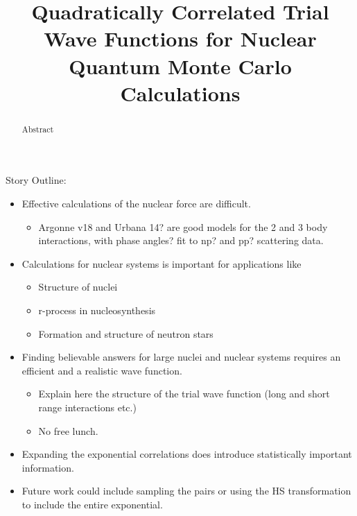\documentclass[12pt]{article}
\title{Quadratically Correlated Trial Wave Functions for Nuclear Quantum Monte Carlo Calculations}
\begin{document}
\maketitle

\begin{abstract}
Abstract
\end{abstract}

Story Outline:
\begin{itemize}
   \item Effective calculations of the nuclear force are difficult.
   \begin{itemize}
      \item Argonne v18 and Urbana 14? are good models for the 2 and 3 body interactions, with phase angles? fit to np? and pp? scattering data.
   \end{itemize}
   \item Calculations for nuclear systems is important for applications like
   \begin{itemize}
      \item Structure of nuclei
      \item r-process in nucleosynthesis
      \item Formation and structure of neutron stars
   \end{itemize}
   \item Finding believable answers for large nuclei and nuclear systems requires an efficient and a realistic wave function.
   \begin{itemize}
      \item Explain here the structure of the trial wave function (long and short range interactions etc.)
   \end{itemize}
   \begin{itemize}
      \item No free lunch.
   \end{itemize}
   \item Expanding the exponential correlations does introduce statistically important information.
   \item Future work could include sampling the pairs or using the HS transformation to include the entire exponential.
\end{itemize}
\end{document}
